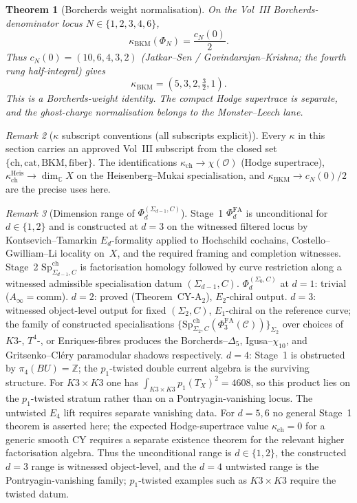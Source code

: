 \documentclass[11pt]{article}
\theoremstyle{plain}
\newtheorem{theorem}{Theorem}[section]
\theoremstyle{definition}
\theoremstyle{remark}
\newtheorem{remark}[theorem]{Remark}
\newcommand{\cC}{\mathcal{C}}
\newcommand{\cO}{\mathcal{O}}
\newcommand{\bC}{\mathbb{C}}
\newcommand{\bZ}{\mathbb{Z}}
\newcommand{\Ainf}{A_\infty}
\newcommand{\Eone}{E_1}
\newcommand{\Etwo}{E_2}
\newcommand{\SpCh}{\mathrm{Sp}^{\mathrm{ch}}}
\begin{document}
\begin{theorem}[Borcherds weight normalisation]
\label{thm:phi-universal-trace}
On the Vol~III Borcherds-denominator locus
$N\in\{1,2,3,4,6\}$,
\[
 \kappa_{\mathrm{BKM}}(\Phi_N)=\frac{c_N(0)}{2}.
\]
Thus $c_N(0)=(10,6,4,3,2)$ \textup{(}Jatkar--Sen /
Govindarajan--Krishna; the fourth rung half-integral\textup{)} gives
\[
 \kappa_{\mathrm{BKM}}=(5,3,2,\tfrac32,1).
\]
This is a Borcherds-weight identity.  The compact Hodge supertrace is
separate, and the ghost-charge normalisation belongs to the
Monster--Leech lane.
\end{theorem}

\begin{remark}[$\kappa$ subscript conventions (all subscripts explicit)]
\label{rem:phi-kappa-subscripts}
Every $\kappa$ in this section carries an approved Vol~III
subscript from the closed set $\{\mathrm{ch}, \mathrm{cat},
\mathrm{BKM}, \mathrm{fiber}\}$. The identifications
$\kappa_{\mathrm{ch}} \to \chi(\cO)$ (Hodge supertrace),
$\kappa_{\mathrm{ch}}^{\mathrm{Heis}} \to \dim_\bC X$ on the
Heisenberg--Mukai specialisation, and
$\kappa_{\mathrm{BKM}} \to c_N(0)/2$ are the precise uses here.
\end{remark}

\begin{remark}[Dimension range of $\Phi_d^{(\Sigma_{d-1},C)}$]
\label{rem:phi-dimensional-range}
Stage~1 $\Phi^{\mathrm{FA}}_d$ is unconditional for $d \in \{1, 2\}$
and is constructed at $d=3$ on the witnessed filtered locus by
Kontsevich--Tamarkin $E_d$-formality applied to Hochschild cochains,
Costello--Gwilliam--Li locality on~$X$, and the required framing and
completion witnesses. Stage~2
$\SpCh_{\Sigma_{d-1}, C}$ is factorisation homology followed by
curve restriction along a witnessed admissible specialisation datum
$(\Sigma_{d-1},C)$.
 $\Phi_d^{(\Sigma_0,C)}$ at $d = 1$: trivial ($\Ainf = \mathrm{comm}$).
$d = 2$: proved (Theorem~\textup{CY-A$_2$}), $\Etwo$-chiral
output. $d = 3$: witnessed object-level output for fixed
$(\Sigma_2,C)$, $\Eone$-chiral on the reference curve; the family of
constructed specialisations
$\{\SpCh_{\Sigma_2, C}(\Phi^{\mathrm{FA}}_3(\cC))\}_{\Sigma_2}$
over choices of $K3$-, $T^4$-, or Enriques-fibres produces
the Borcherds--$\Delta_5$, Igusa--$\chi_{10}$, and
Gritsenko--Cl\'ery paramodular shadows respectively.
$d = 4$: Stage~1 is obstructed by $\pi_4(BU) = \bZ$; the
$p_1$-twisted double current algebra is the surviving structure.
For $K3\times K3$ one has
$\int_{K3\times K3}p_1(T_X)^2=4608$, so this product lies on the
$p_1$-twisted stratum rather than on a Pontryagin-vanishing locus.
The untwisted $E_4$ lift requires separate vanishing data. For $d = 5, 6$ no general
Stage~1 theorem is asserted here; the expected Hodge-supertrace value
$\kappa_{\mathrm{ch}}=0$ for a generic smooth CY requires a separate
existence theorem for the relevant higher factorisation algebra.
Thus the unconditional range is $d \in \{1, 2\}$, the constructed
$d=3$ range is witnessed object-level, and the $d=4$
untwisted range is the Pontryagin-vanishing family; $p_1$-twisted
examples such as $K3\times K3$ require the twisted datum.
\end{remark}
\end{document}
